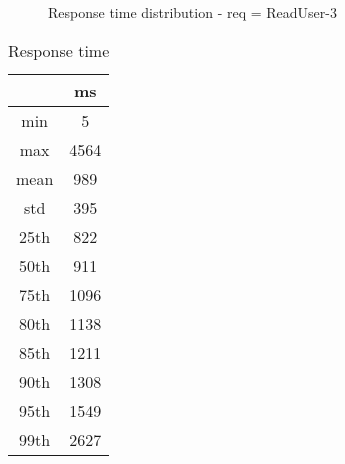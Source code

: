 \begin{minipage}{0.75\linewidth}
\begin{figure}[h]
\begin{adjustbox}{max width=1.0\linewidth, keepaspectratio}
  \end{adjustbox}
  \caption{Response time distribution - req = ReadUser-3}
\end{figure}
\end{minipage}\hfill\begin{minipage}{0.18\linewidth}
\begin{table}[h]
\begin{tabular}{|cc|}
\hline
\textbf{} & \textbf{ms}\\ \hline
 \Xhline{0.005\arrayrulewidth}
min & 5\\
 \Xhline{0.005\arrayrulewidth}
max & 4564\\
 \Xhline{0.005\arrayrulewidth}
mean & 989\\
 \Xhline{0.005\arrayrulewidth}
std & 395\\
\hline
\hline
 \Xhline{0.005\arrayrulewidth}
25th & 822\\
 \Xhline{0.005\arrayrulewidth}
50th & 911\\
 \Xhline{0.005\arrayrulewidth}
75th & 1096\\
 \Xhline{0.005\arrayrulewidth}
80th & 1138\\
 \Xhline{0.005\arrayrulewidth}
85th & 1211\\
 \Xhline{0.005\arrayrulewidth}
90th & 1308\\
 \Xhline{0.005\arrayrulewidth}
95th & 1549\\
 \Xhline{0.005\arrayrulewidth}
99th & 2627\\
\hline
\end{tabular}
\caption{Response time}
\end{table}
\end{minipage}\hfill